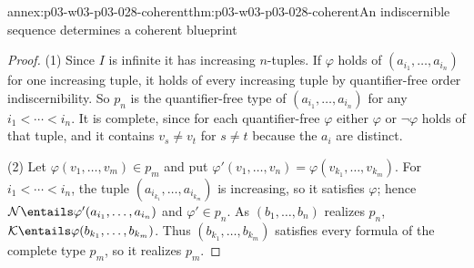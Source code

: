 \begin{annexitem}{annex:p03-w03-p03-028-coherent}{thm:p03-w03-p03-028-coherent}{An indiscernible sequence determines a coherent blueprint}
\begin{proof}
(1) Since \(I\) is infinite it has increasing \(n\)-tuples.  If
\(\varphi\) holds of \((a_{i_1},\ldots,a_{i_n})\) for one increasing tuple,
it holds of every increasing tuple by quantifier-free order
indiscernibility.  So \(p_n\) is the quantifier-free type of
\((a_{i_1},\ldots,a_{i_n})\) for any \(i_1<\cdots<i_n\).  It is complete,
since for each quantifier-free \(\varphi\) either \(\varphi\) or
\(\neg\varphi\) holds of that tuple, and it contains \(v_s\neq v_t\) for
\(s\neq t\) because the \(a_i\) are distinct.

(2) Let \(\varphi(v_1,\ldots,v_m)\in p_m\) and put
\(\varphi'(v_1,\ldots,v_n)=\varphi(v_{k_1},\ldots,v_{k_m})\).  For
\(i_1<\cdots<i_n\), the tuple \((a_{i_{k_1}},\ldots,a_{i_{k_m}})\) is
increasing, so it satisfies \(\varphi\); hence
\(\mathcal N\entails\varphi'(a_{i_1},\ldots,a_{i_n})\) and
\(\varphi'\in p_n\).  As \((b_1,\ldots,b_n)\) realizes \(p_n\),
\(\mathcal K\entails\varphi(b_{k_1},\ldots,b_{k_m})\).  Thus
\((b_{k_1},\ldots,b_{k_m})\) satisfies every formula of the complete type
\(p_m\), so it realizes \(p_m\).
\end{proof}
\end{annexitem}

